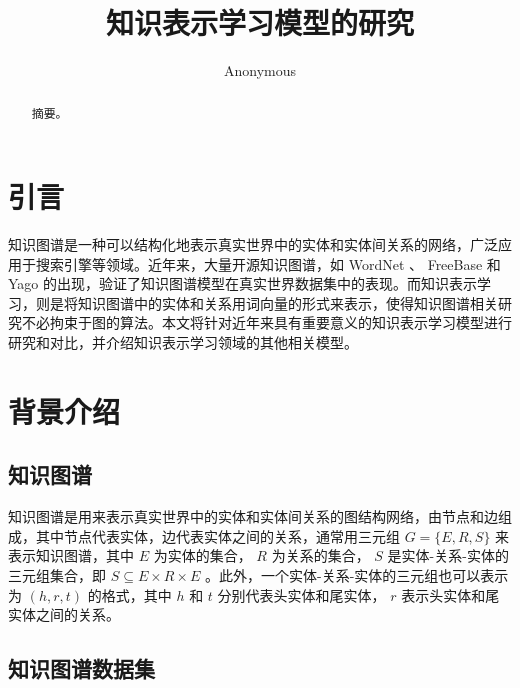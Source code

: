 \documentclass{llncs}
\begin{document}
\title{知识表示学习模型的研究}
\author{Anonymous}
\maketitle

\begin{abstract}

摘要。


\end{abstract}

\section{引言}

知识图谱\cite{DBLP:journals/pieee/Nickel0TG16}是一种可以结构化地表示真实世界中的实体和实体间关系的网络，广泛应用于搜索引擎等领域。近年来，大量开源知识图谱，如 WordNet\cite{Miller:1995:WLD:219717.219748} 、 FreeBase\cite{Bollacker:2008:FCC:1376616.1376746} 和 Yago\cite{suchanek2007yago} 的出现，验证了知识图谱模型在真实世界数据集中的表现。而知识表示学习\cite{DBLP:journals/corr/abs-1812-10901}，则是将知识图谱中的实体和关系用词向量的形式来表示，使得知识图谱相关研究不必拘束于图的算法。本文将针对近年来具有重要意义的知识表示学习模型进行研究和对比，并介绍知识表示学习领域的其他相关模型。

\section{背景介绍}

\subsection{知识图谱}

知识图谱是用来表示真实世界中的实体和实体间关系的图结构网络，由节点和边组成，其中节点代表实体，边代表实体之间的关系，通常用三元组 $G=\{E,R,S\}$ 来表示知识图谱，其中 $E$ 为实体的集合， $R$ 为关系的集合， $S$ 是实体-关系-实体的三元组集合，即 $S\subseteq{E×R×E}$ 。此外，一个实体-关系-实体的三元组也可以表示为 $(h,r,t)$ 的格式，其中 $h$ 和 $t$ 分别代表头实体和尾实体， $r$ 表示头实体和尾实体之间的关系。

\subsection{知识图谱数据集}
\end{document}
